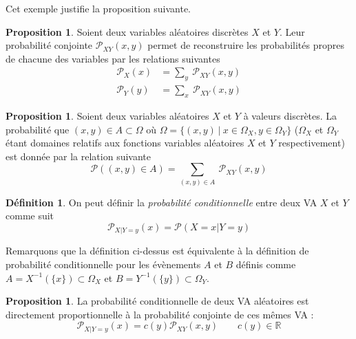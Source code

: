 \documentclass[a4paper,12pt]{report}
\theoremstyle{definition}
\newcommand{\R}{\mathbb{R}}
\renewcommand{\(}{\left(}
\renewcommand{\)}{\right)}
\renewcommand{\P}{\mathcal{P}}
\renewcommand{\d}{\textit}
\newtheorem{defn}[thm]{Définition}
\newtheorem{prop}[thm]{Proposition}
\begin{document}
        Cet exemple justifie la proposition suivante.
        \begin{leftbar}
        \begin{prop}
            Soient deux variables aléatoires discrètes $X$ et $Y$. Leur probabilité conjointe $\P_{XY}(x,y)$ permet de reconstruire les probabilités propres de chacune des variables par les relations suivantes
            \begin{align*}
                \P_X(x) &= \sum_y~\P_{XY}(x,y)\\
                \P_Y(y) &= \sum_x~\P_{XY}(x,y)
            \end{align*}
            
        \end{prop}
        \end{leftbar}
    
        \begin{leftbar}
        \begin{prop}
            Soient deux variables aléatoires $X$ et $Y$ à valeurs discrètes. La probabilité que $(x,y)\in A\subset\Omega$ où $\Omega = \{(x,y)~|~x\in\Omega_X,y\in\Omega_Y\}$ ($\Omega_X$ et $\Omega_Y$ étant domaines relatifs aux fonctions variables aléatoires $X$ et $Y$ respectivement) est donnée par la relation suivante
            $$\P((x,y)\in A) = \sum_{(x,y)\in A}~\P_{XY}(x,y)$$
        \end{prop}
        \end{leftbar}
    
        \begin{leftbar}
        \begin{defn}
            On peut définir la \d{probabilité conditionnelle} entre deux VA $X$ et $Y$ comme suit
            $$\P_{X|Y=y}(x)=\P(X=x|Y=y)$$
        \end{defn}
        \end{leftbar}
        Remarquons que la définition ci-dessus est équivalente à la définition de probabilité conditionnelle pour les évènements $A$ et $B$ définis comme $A = X^{-1}(\{x\}) \subset \Omega_X$ et $B = Y^{-1}(\{y\})\subset \Omega_Y$.
        \begin{leftbar}
        \begin{prop}
            La probabilité conditionnelle de deux VA aléatoires est directement proportionnelle à la probabilité conjointe de ces mêmes VA :
            $$\P_{X|Y=y}(x)=c(y)\P_{XY}(x,y)\qquad c(y)\in \R$$
        \end{prop}
        \end{leftbar}
        
\end{document}
